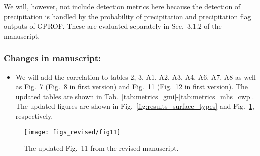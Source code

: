 We will, however, not include detection metrics here because the detection of
precipitation is handled by the probability of precipitation and precipitation
flag outputs of GPROF. These are evaluated separately in Sec.~3.1.2 of the
manuscript.

\subsubsection*{Changes in manuscript:}

\begin{itemize}
  \item We will add the correlation to tables 2, 3, A1, A2, A3, A4, A6,
    A7, A8 as well as Fig.~7 (Fig.~8 in first version) and Fig.~11 (Fig.~12
    in first version). The updated tables are shown in Tab.~\ref{tab:metrics_gmi}-\ref{tab:metrics_mhs_cwp}.
    The updated figures are shown in Fig.~\ref{fig:results_surface_types} and
    Fig.~\ref{fig:results_profiles}, respectively.

\end{itemize}

\begin{figure}[hbpt]
  \centering
  \texttt{[image: figs\_revised/fig11]}
  \caption{
    The updated Fig.~11 from the revised manuscript.
  }
  \label{fig:results_profiles}
\end{figure}

